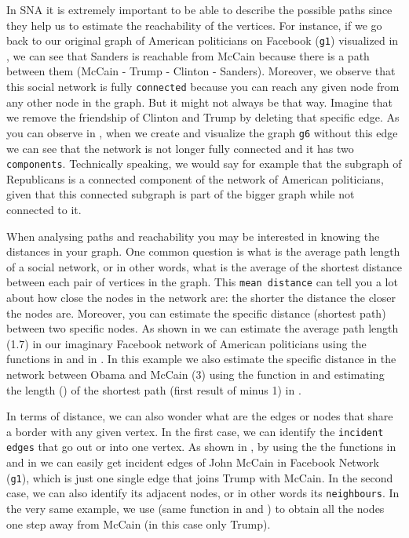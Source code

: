 In SNA it is extremely important to be able to describe the possible paths since they help us to estimate the reachability of the vertices. For instance, if we go back to our original graph of American politicians on Facebook (\texttt{g1}) visualized in , we can see that Sanders is reachable from McCain because there is a path between them (McCain - Trump - Clinton - Sanders).  Moreover, we observe that this social network is fully \texttt{connected} because you can reach any given node from any other node in the graph. But it might not always be that way. Imagine that we remove the friendship of Clinton and Trump by deleting that specific edge. As you can observe in , when we create and visualize the graph \texttt{g6} without this edge we can see that the network is not longer fully connected and it has two \texttt{components}. Technically speaking, we would say for example that the subgraph of Republicans is a connected component of the network of American politicians, given that this connected subgraph is part of the bigger graph while not connected to it.


When analysing paths and reachability you may be interested in knowing the distances in your graph. One common question is what is the average path length of a social network, or in other words, what is the average of the shortest distance between each pair of vertices in the graph. This \texttt{mean distance} can tell you a lot about how close the nodes in the network are: the shorter the distance the closer the nodes are. Moreover, you can estimate the specific distance (shortest path) between two specific nodes.  As shown in  we can estimate the average path length (1.7) in our imaginary Facebook network of American politicians using the functions  in  and  in . In this example we also estimate the specific distance in the network between Obama and McCain (3) using the function  in  and estimating the length () of the shortest path (first result of  minus 1) in .


In terms of distance, we can also wonder what are the edges or nodes that share a border with any given vertex. In the first case, we can identify the \texttt{incident edges} that go out or into one vertex. As shown in , by using the the functions  in  and  in  we can easily get incident edges of John McCain in Facebook Network (\texttt{g1}), which is just one single edge that joins Trump with McCain. In the second case, we can also identify its adjacent nodes, or in other words its \texttt{neighbours}. In the very same example, we use  (same function in  and ) to obtain all the nodes one step away from McCain (in this case only Trump).

